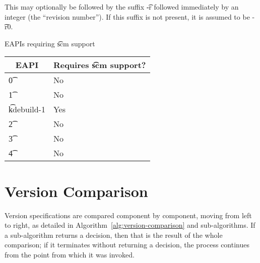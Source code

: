 This may optionally be followed by the suffix \t{-r} followed immediately by an integer (the
``revision number''). If this suffix is not present, it is assumed to be \t{-r0}.

\IFKDEBUILDELSE
{
    \begin{centertable}{EAPIs requiring \t{scm} support} \label{tab:scm-table}
    \begin{tabular}{ l l }
        \toprule
        \multicolumn{1}{c}{\textbf{EAPI}} &
        \multicolumn{1}{c}{\textbf{Requires \t{scm} support?}} \\
        \midrule
    \t{0} & No \\
    \t{1} & No \\
    \t{kdebuild-1} & Yes \\
    \t{2} & No \\
    \t{3} & No \\
    \t{4} & No \\
    \bottomrule
    \end{tabular}
    \end{centertable}
}{
}

\section{Version Comparison}

Version specifications are compared component by component, moving from left to right,
as detailed in Algorithm~\ref{alg:version-comparison} and sub-algorithms.
If a sub-algorithm returns a decision, then that is the result of the whole comparison;
if it terminates without returning a decision, the process continues from the point
from which it was invoked.

